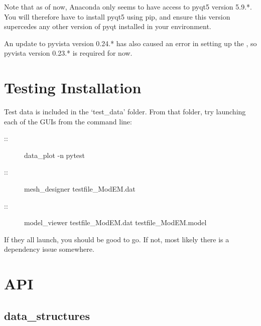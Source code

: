 \documentclass[letterpaper,10pt,english]{sphinxmanual}
\begin{document}
Note that as of now, Anaconda only seems to have access to pyqt5 version 5.9.*. You will therefore have to install pyqt5 using pip, and ensure this version supercedes any other version of pyqt installed in your environment.

An update to pyvista version 0.24.* has also caused an error in setting up the {\hyperref[\detokenize{content/model_viewer/main_window:model-viewer}]{}}, so pyvista version 0.23.* is required for now.


\chapter{Testing Installation}
\label{\detokenize{content/api_core/testing_installation:testing-installation}}\label{\detokenize{content/api_core/testing_installation::doc}}
Test data is included in the ‘test\_data’ folder.
From that folder, try launching each of the GUIs from the command line:
\begin{description}
\item[{{\hyperref[\detokenize{content/data_plot/main_window:data-plot}]{}}::}] \leavevmode
data\_plot -n pytest

\item[{{\hyperref[\detokenize{content/mesh_designer/main_window:mesh-designer}]{}}::}] \leavevmode
mesh\_designer testfile\_ModEM.dat

\item[{{\hyperref[\detokenize{content/model_viewer/main_window:model-viewer}]{}}::}] \leavevmode
model\_viewer testfile\_ModEM.dat testfile\_ModEM.model

\end{description}

If they all launch, you should be good to go.
If not, most likely there is a dependency issue somewhere.


\chapter{API}
\label{\detokenize{index:api}}

\section{data\_structures}
\label{\detokenize{content/api_core/data_structures:data-structures}}\label{\detokenize{content/api_core/data_structures::doc}}
\end{document}
